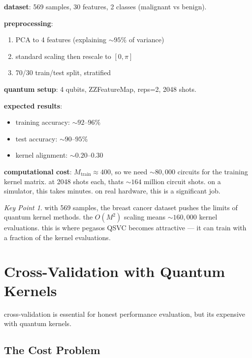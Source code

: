 \documentclass[11pt,a4paper]{article}
\theoremstyle{definition}
\theoremstyle{remark}
\newtheorem*{keypoint}{Key Point}
\begin{document}
\textbf{dataset}: 569 samples, 30 features, 2 classes (malignant vs benign).

\textbf{preprocessing}:
\begin{enumerate}[leftmargin=*]
    \item PCA to 4 features (explaining $\sim 95\%$ of variance)
    \item standard scaling then rescale to $[0, \pi]$
    \item 70/30 train/test split, stratified
\end{enumerate}

\textbf{quantum setup}: 4 qubits, ZZFeatureMap, reps=2, 2048 shots.

\textbf{expected results}:
\begin{itemize}[leftmargin=*]
    \item training accuracy: $\sim 92$--$96\%$
    \item test accuracy: $\sim 90$--$95\%$
    \item kernel alignment: $\sim 0.20$--$0.30$
\end{itemize}

\textbf{computational cost}: $M_{\text{train}} \approx 400$, so we need $\sim 80{,}000$ circuits for the training kernel matrix. at 2048 shots each, thats $\sim 164$ million circuit shots. on a simulator, this takes minutes. on real hardware, this is a significant job.

\begin{keypoint}
with 569 samples, the breast cancer dataset pushes the limits of quantum kernel methods. the $O(M^2)$ scaling means $\sim 160{,}000$ kernel evaluations. this is where pegasos QSVC becomes attractive --- it can train with a fraction of the kernel evaluations.
\end{keypoint}

\section{Cross-Validation with Quantum Kernels}

cross-validation is essential for honest performance evaluation, but its expensive with quantum kernels.

\subsection{The Cost Problem}
\end{document}
